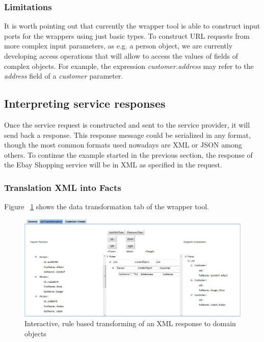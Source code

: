 \subsubsection{Limitations} %
\label{ssub:limitations}



It is worth pointing out that currently the wrapper tool is able to construct input ports for the wrappers using just basic types. To construct URL requests from more complex input parameters, as e.g. a person object, we are currently developing access operations that will allow to access the values of fields of complex objects. For example, the expression \emph{customer.address} may refer to the \emph{address} field of a \emph{customer} parameter.  



\subsection{Interpreting service responses} %
\label{sub:interpreting_service_responses}

Once the service request is constructed and sent to the service provider, it will send back a response. This response message could be serialized in any format, though the most common formats used nowadays are XML or JSON among others. To continue the example started in the previous section, the response of the Ebay Shopping service will be in XML as specified in the request.

\subsubsection{Translation XML into Facts} %
\label{ssub:translation_xml_into_facts}

Figure ~\ref{fig:response_service_execution} shows the data transformation tab of the wrapper tool. 

\begin{figure}
  \begin{center}
    \includegraphics[width=\linewidth]{images/ServiceWrapperToolGVSWithTransformationRules.png}
    \caption{Interactive, rule based transforming of an XML response to domain objects}
    \label{fig:response_service_execution}
  \end{center}
\end{figure}

